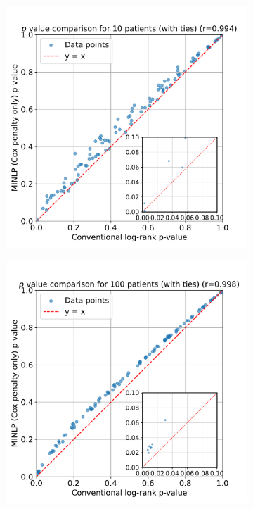 \documentclass[article]{jss}
\begin{document}
\begin{figure}
\centering
\begin{subfigure}[t]{0.32\textwidth}
  \centering
  \includegraphics[width=\linewidth]{p_value_comparison_10_patients.pdf}
  \caption{\label{fig:compare-p-value-10-patients}}
\end{subfigure}
\begin{subfigure}[t]{0.32\textwidth}
  \centering
  \includegraphics[width=\linewidth]{p_value_comparison_100_patients.pdf}

\end{subfigure}
\end{figure}
\end{document}
